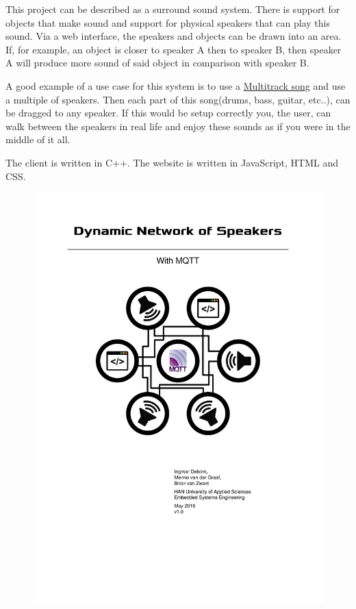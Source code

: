 This project can be described as a surround sound system.
There is support for objects that make sound and support for physical speakers that can play this sound.
Via a web interface, the speakers and objects can be drawn into an area.
If, for example, an object is closer to speaker A then to speaker B,
then speaker A will produce more sound of said object in comparison with speaker B.

A good example of a use case for this system is to use a \href{https://en.wikipedia.org/wiki/Multitrack_recording}{Multitrack song} and use a multiple of speakers.
Then each part of this song(drums, bass, guitar, etc..), can be dragged to any speaker.
If this would be setup correctly you, the user,
can walk between the speakers in real life and enjoy these sounds as if you were in the middle of it all.


The client is written in C++. The website is written in JavaScript, HTML and CSS.

\vspace{15ex}

\begin{figure}[H]
    \centering
    \includegraphics[height=.2\paperheight]{dynamic_network_of_speakers}
\end{figure}
